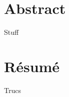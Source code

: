 \section*{Abstract}

\begin{outline}
\1 Stuff
\end{outline}


\newpage
\section*{Résumé}


\begin{outline}
\1 Trucs
\end{outline}
